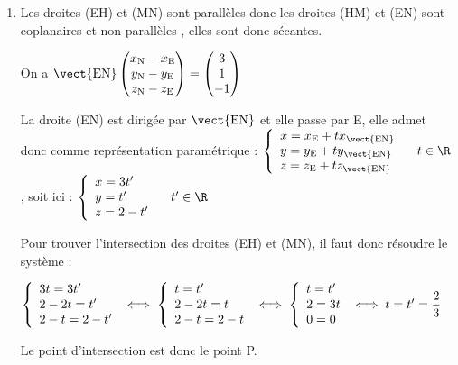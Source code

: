 \begin{enumerate}
\begin{enumerate}
L'angle ne dépasse pas $55 \degres$, le toit peut donc être construit.
	\end{enumerate}
\item 	Les droites (EH) et (MN) sont parallèles donc les droites (HM) et (EN) sont coplanaires et non parallèles , elles sont donc sécantes.

On a  $\vect{\mathrm{EN}}\begin{pmatrix} x_\mathrm{N}-x_\mathrm{E}\\y_\mathrm{N}-y_\mathrm{E}\\z_\mathrm{N}-z_\mathrm{E} \end{pmatrix} = \begin{pmatrix} 3\\1\\-1\end{pmatrix}$

La droite (EN) est dirigée par $\vect{\mathrm{EN}}$ et elle passe par E, elle admet donc comme représentation paramétrique : $ \left\{\begin{array}{l} x=x_\mathrm{E} + tx_{\vect{\mathrm{EN}}}\\y=y_\mathrm{E} + ty_{\vect{\mathrm{EN}}}\\z=z_\mathrm{E} + tz_{\vect{\mathrm{EN}}} \end{array}\right. \quad t \in \R $, soit ici : $ \left\{\begin{array}{l} x=3t'\\y= t'\\z=2-t' \end{array}\right. \quad t'\in \R $

Pour trouver l'intersection des droites (EH) et (MN), il faut donc résoudre le système :

$\left\{\begin{array}{l}
3t	=3t'\\
2-2t 	=t'\\
2-t	=2-t'\\
\end{array}\right. \iff \left\{\begin{array}{l c l}
t=t'\\
2-2t=t\\
2-t=2-t\\
\end{array}\right.\iff \left\{\begin{array}{l c l}
t=t'\\
2=3t\\
0=0\\
\end{array}\right.\iff t=t'=\dfrac{2}{3}$

Le point d'intersection est donc le point P.
\end{enumerate}

\bigskip
